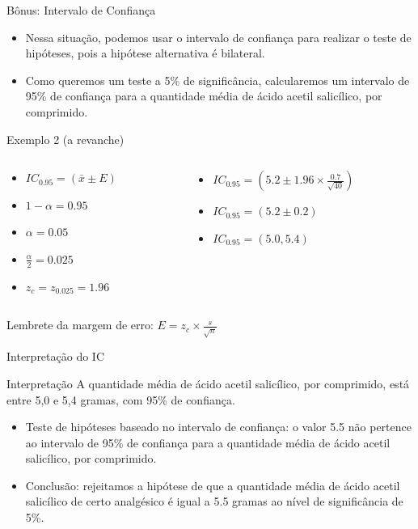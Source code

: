 \documentclass{beamer}
\begin{document}
\begin{frame}{Bônus: Intervalo de Confiança}
  \begin{itemize}
  \item Nessa situação, podemos usar o intervalo de confiança para
    realizar o teste de hipóteses, pois a hipótese alternativa é
    bilateral.
  \item Como queremos um teste a 5\% de significância, calcularemos um
    intervalo de 95\% de confiança para a quantidade média de ácido
    acetil salicílico, por comprimido.
  \end{itemize}
\end{frame}

\begin{frame}{Exemplo 2 (a revanche)}
  \begin{example}
    \begin{columns}
      \begin{column}{5cm}
        \begin{itemize}
        \item $IC_{0.95} = (\bar{x} \pm E)$
        \item $1-\alpha = 0.95$
        \item $\alpha = 0.05$
        \item $\frac{\alpha}{2} = 0.025$
        \item $z_c = z_{0.025} = 1.96$
        \end{itemize}
      \end{column}
      \begin{column}{5cm}
        \begin{itemize}
        \item $IC_{0.95} = (5.2 \pm 1.96 \times \frac{0.7}{\sqrt{40}})$
        \item $IC_{0.95} = (5.2 \pm 0.2)$
        \item $IC_{0.95} = (5.0 , 5.4)$
        \end{itemize}
      \end{column}
    \end{columns}
  \end{example}

  Lembrete da margem de erro: $E = z_c \times\frac{s}{\sqrt{n}}$
\end{frame}

\begin{frame}{Interpretação do IC}
  \begin{block}{Interpretação}
    A quantidade média de ácido acetil salicílico, por comprimido,
    está entre 5,0 e 5,4 gramas, com 95\% de confiança.
  \end{block}
  \begin{itemize}
  \item Teste de hipóteses baseado no intervalo de confiança: o valor
    5.5 não pertence ao intervalo de 95\% de confiança para a
    quantidade média de ácido acetil salicílico, por comprimido.
  \item Conclusão: rejeitamos a hipótese de que a quantidade média de
    ácido acetil salicílico de certo analgésico é igual a 5.5 gramas
    ao nível de significância de 5\%.
  \end{itemize}
\end{frame}
\end{document}
